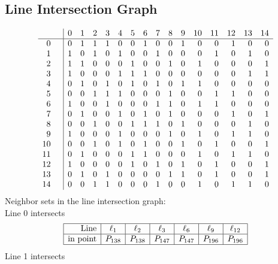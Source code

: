 \documentclass{article}
\begin{document}
{\subsection*{Line Intersection Graph}
{\arraycolsep=1pt
$$
\begin{array}{rr|*{15}r}
 &  & 0 & 1 & 2 & 3 & 4 & 5 & 6 & 7 & 8 & 9 & 10 & 11 & 12 & 13 & 14\\
\hline
0 &  & 0 & 1 & 1 & 1 & 0 & 0 & 1 & 0 & 0 & 1 & 0 & 0 & 1 & 0 & 0\\
1 &  & 1 & 0 & 1 & 0 & 1 & 0 & 0 & 1 & 0 & 0 & 0 & 1 & 0 & 1 & 0\\
2 &  & 1 & 1 & 0 & 0 & 0 & 1 & 0 & 0 & 1 & 0 & 1 & 0 & 0 & 0 & 1\\
3 &  & 1 & 0 & 0 & 0 & 1 & 1 & 1 & 0 & 0 & 0 & 0 & 0 & 0 & 1 & 1\\
4 &  & 0 & 1 & 0 & 1 & 0 & 1 & 0 & 1 & 0 & 1 & 1 & 0 & 0 & 0 & 0\\
5 &  & 0 & 0 & 1 & 1 & 1 & 0 & 0 & 0 & 1 & 0 & 0 & 1 & 1 & 0 & 0\\
6 &  & 1 & 0 & 0 & 1 & 0 & 0 & 0 & 1 & 1 & 0 & 1 & 1 & 0 & 0 & 0\\
7 &  & 0 & 1 & 0 & 0 & 1 & 0 & 1 & 0 & 1 & 0 & 0 & 0 & 1 & 0 & 1\\
8 &  & 0 & 0 & 1 & 0 & 0 & 1 & 1 & 1 & 0 & 1 & 0 & 0 & 0 & 1 & 0\\
9 &  & 1 & 0 & 0 & 0 & 1 & 0 & 0 & 0 & 1 & 0 & 1 & 0 & 1 & 1 & 0\\
10 &  & 0 & 0 & 1 & 0 & 1 & 0 & 1 & 0 & 0 & 1 & 0 & 1 & 0 & 0 & 1\\
11 &  & 0 & 1 & 0 & 0 & 0 & 1 & 1 & 0 & 0 & 0 & 1 & 0 & 1 & 1 & 0\\
12 &  & 1 & 0 & 0 & 0 & 0 & 1 & 0 & 1 & 0 & 1 & 0 & 1 & 0 & 0 & 1\\
13 &  & 0 & 1 & 0 & 1 & 0 & 0 & 0 & 0 & 1 & 1 & 0 & 1 & 0 & 0 & 1\\
14 &  & 0 & 0 & 1 & 1 & 0 & 0 & 0 & 1 & 0 & 0 & 1 & 0 & 1 & 1 & 0\\
\end{array}
$$
}%
Neighbor sets in the line intersection graph:\\
Line 0 intersects 
$$
\begin{array}{|r*{6}{|c}|}
\hline
\mbox{Line}  & \ell_{1} & \ell_{2} & \ell_{3} & \ell_{6} & \ell_{9} & \ell_{12}\\
\hline
\mbox{in point}  & P_{138} & P_{138} & P_{147} & P_{147} & P_{196} & P_{196}\\
\hline
\end{array}
$$
Line 1 intersects 
$$
\begin{array}{|r*{6}{|c}|}

\end{array}$$}
\end{document}

